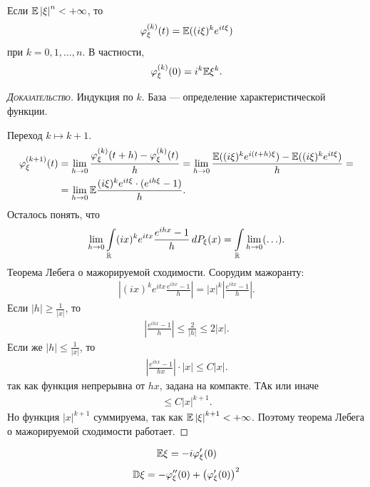 \documentclass[../main.tex]{subfiles}
\begin{document}
\begin{thm}
 Если $ \mathbb E \left| \xi \right|^{n} < +\infty $, то
 \begin{align*}
  \varphi_\xi^{(k)}(t) = \mathbb E((i\xi)^{k}e^{it\xi})
 \end{align*} при $ k = 0, 1, \ldots, n $. В частности,
 \begin{align*}
  \varphi_\xi^{(k)}(0) = i^{k} \mathbb E\xi^{k}.
 \end{align*}
\end{thm}
\begin{proof}[\normalfont\textsc{Доказательство}]
 Индукция по $ k $. База --- определение характеристической функции.

 Переход $ k \mapsto k + 1 $.
 \begin{align*}
  \varphi_\xi^{(k+1)}(t) &= \lim_{h \to 0} \frac{\varphi_\xi^{(k)}(t+h) - \varphi_\xi^{(k)}(t)}{h} = \lim_{h \to 0} \frac{\mathbb E((i\xi)^{k}e^{i(t+h)\xi}) - \mathbb E((i\xi)^{k}e^{it\xi})}{h} = \\
  &= \lim_{h \to 0} \mathbb E \frac{(i\xi)^{k}e^{it\xi} \cdot (e^{ih\xi} - 1)}{h}.
 \end{align*} Осталось понять, что
 \begin{align*}
  \lim_{h \to 0} \int\limits_{\mathbb{R}} (ix)^{k}e^{itx} \frac{e^{ihx} - 1}{h}\,dP_\xi(x) = \int\limits_{\mathbb{R}} \lim_{h \to 0} (\ldots).
 \end{align*} Теорема Лебега о мажорируемой сходимости. Соорудим мажоранту:
 \begin{align*}
  \left| (ix)^{k}e^{itx}\frac{e^{ihx}-1}{h} \right| = \left| x \right|^{k} \left| \frac{e^{ihx}-1}{h} \right|.
 \end{align*} Если $ \left| h \right| \geqslant \frac{1}{\left| x \right|} $, то
 \begin{align*}
  \left| \frac{e^{ihx}-1}{h} \right| \leqslant \frac{2}{\left| h \right|} \leqslant 2 \left| x \right|.
 \end{align*} Если же $ \left| h \right| \leqslant \frac{1}{\left| x \right|} $, то
 \begin{align*}
  \left| \frac{e^{ihx}-1}{hx} \right| \cdot \left| x \right| \leqslant C \left| x \right|.
 \end{align*} так как функция непрерывна от $ hx $, задана на компакте. ТАк или иначе
 \begin{align*}
  \leqslant C \left| x \right|^{k+1}. 
 \end{align*} Но функция $ \left| x \right|^{k+1} $ суммируема, так как $ \mathbb E \left| \xi \right|^{k+1}  < +\infty$. Поэтому теорема Лебега о мажорируемой сходимости работает.
\end{proof}
\begin{crly}
 \begin{align*}
  \mathbb E\xi = -i \varphi'_\xi(0)
 \end{align*}
 \begin{align*}
  \mathbb D\xi = -\varphi''_\xi(0) + \left( \varphi'_\xi(0) \right)^{2}
 \end{align*}
\end{crly}
\end{document}
